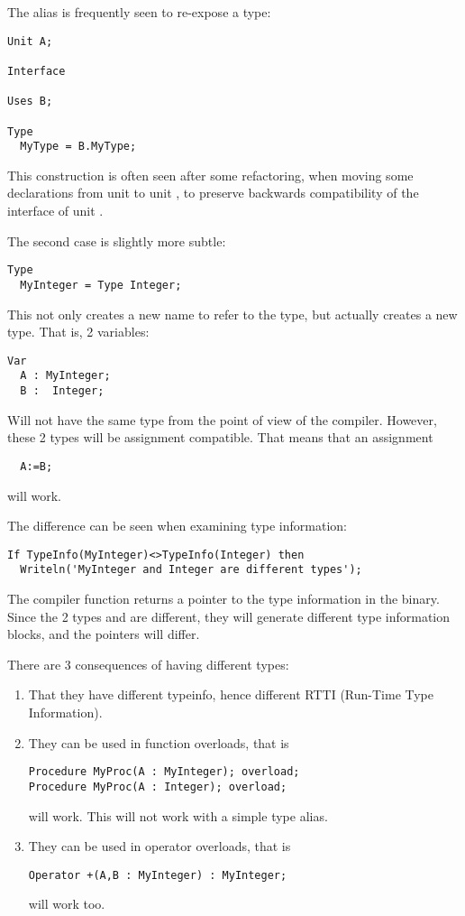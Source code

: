 The alias is frequently seen to re-expose a type:
\begin{verbatim}
Unit A;

Interface

Uses B;

Type
  MyType = B.MyType;
\end{verbatim}
This construction is often seen after some refactoring, when moving some
declarations from unit  to unit , to preserve backwards compatibility 
of the interface of unit .

The second case is slightly more subtle:
\begin{verbatim}
Type
  MyInteger = Type Integer;
\end{verbatim}
This not only creates a new name to refer to the  type, but
actually creates a new type. That is, 2 variables:
\begin{verbatim}
Var
  A : MyInteger;
  B :  Integer;
\end{verbatim}
Will not have the same type from the point of view of the compiler. However,
these 2 types will be assignment compatible. That means that an assignment
\begin{verbatim}
  A:=B;
\end{verbatim}
will work.

The difference can be seen when examining type information:
\begin{verbatim}
If TypeInfo(MyInteger)<>TypeInfo(Integer) then
  Writeln('MyInteger and Integer are different types');
\end{verbatim}
The compiler function  returns a pointer to the type
information in the binary. Since the 2 types  and
 are different, they will generate different type 
information blocks, and the pointers will differ.

There are 3 consequences of having different types:
\begin{enumerate}
\item That they have different typeinfo, hence different RTTI (Run-Time Type Information).
\item They can be used in function overloads, that is
\begin{verbatim}
Procedure MyProc(A : MyInteger); overload;
Procedure MyProc(A : Integer); overload;
\end{verbatim}
will work. This will not work with a simple type alias.
\item They can be used in operator overloads, that is
\begin{verbatim}
Operator +(A,B : MyInteger) : MyInteger; 
\end{verbatim}
will work too.
\end{enumerate}

